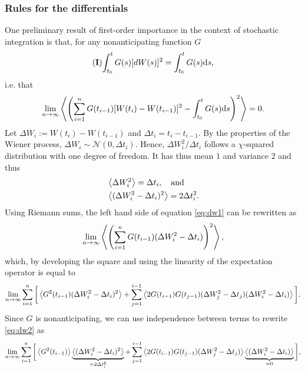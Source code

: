 \subsubsection{Rules for the differentials}
One preliminary result of first-order importance in the context of stochastic integration is that, for any nonanticipating function $G$
\begin{equation} \label{eq:dW=dt_int}
	\mathbf{(I)\!}\int_{t_0}^t G(s) \mathrm [dW(s)]^2 = \int_{t_0}^t G(s) \mathrm ds,	
\end{equation}
i.e. that
\begin{equation} \label{eq:dw1}
	\lim_{n\rightarrow\infty} \left\langle \left(\sum_{i=1}^n G(t_{i-1})[W(t_i)-W(t_{i-1})]^2-\int_{t_0}^t G(s) \mathrm ds\right)^2 \right\rangle = 0.
\end{equation}
Let $\Delta W_i := W(t_i) - W(t_{i-1})$ and $\Delta t_i = t_i - t_{i-1}$. By the properties of the Wiener process, $\Delta W_i \sim \mathcal{N}(0,\Delta t_i)$. Hence, $\Delta W_i^2/\Delta t_i$ follows a $\chi$-squared distribution with one degree of freedom. It has thus mean $1$ and variance $2$ and thus
\begin{subequations} \label{eq:dwprop}
\begin{align}
        &\left\langle \Delta W_i^2 \right\rangle = \Delta t_i, \quad \mbox{and} \label{eq:dwesp}\\
        &\left\langle (\Delta W_i^2 - \Delta t_i)^2 \right\rangle = 2 \Delta t_i^2. \label{eq:dwvar}
\end{align}
\end{subequations}
Using Riemann sums, the left hand side of equation \eqref{eq:dw1} can be rewritten as
\begin{equation}
	\lim_{n\rightarrow\infty} \left\langle \left(\sum_{i=1}^n G(t_{i-1})(\Delta W_i^2-\Delta t_i)\right)^2 \right\rangle,
\end{equation}
which, by developing the square and using the linearity of the expectation operator is equal to
\begin{equation} \label{eq:dw2}
	\lim_{n\rightarrow\infty} \sum_{i=1}^n \bigg[\left\langle G^2(t_{i-1})(\Delta W_i^2-\Delta t_i)^2 \right\rangle + \sum_{j=1}^{i-1} \left\langle 2G(t_{i-1})G(t_{j-1})(\Delta W_j^2 - \Delta t_j)(\Delta W_i^2 - \Delta t_i) \right\rangle\bigg].
\end{equation}
Since $G$ is nonanticipating, we can use independence between terms to rewrite \eqref{eq:dw2} as
\begin{equation} \label{eq:dw3}
	\lim_{n\rightarrow\infty} \sum_{i=1}^n \bigg[\left\langle G^2(t_{i-1}) \right\rangle\underbrace{\left\langle (\Delta W_i^2-\Delta t_i)^2 \right\rangle}_{=2\Delta t_i^2} + \sum_{j=1}^{i-1} \left\langle 2G(t_{i-1})G(t_{j-1})(\Delta W_j^2 - \Delta t_j) \right\rangle\underbrace{\left\langle (\Delta W_i^2 - \Delta t_i) \right\rangle}_{=0}\bigg],
\end{equation}
